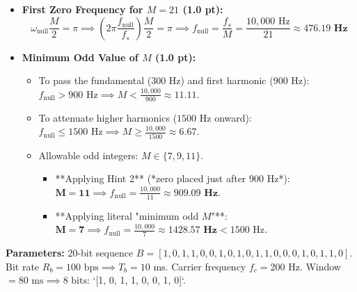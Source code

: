 \documentclass[10pt,a4paper]{article}
\begin{document}
\begin{itemize}[leftmargin=12pt, itemsep=1.5pt]
    \item \textbf{First Zero Frequency for $M = 21$ (1.0 pt):}
    $$\omega_{\text{null}} \frac{M}{2} = \pi \implies \left(2\pi \frac{f_{\text{null}}}{f_s}\right) \frac{M}{2} = \pi \implies f_{\text{null}} = \frac{f_s}{M} = \frac{10,000\text{ Hz}}{21} \approx \mathbf{476.19\text{ Hz}}$$
    \item \textbf{Minimum Odd Value of $M$ (1.0 pt):}
    \begin{itemize}[leftmargin=10pt, itemsep=0.5pt]
        \item To pass the fundamental ($300\text{ Hz}$) and first harmonic ($900\text{ Hz}$): $f_{\text{null}} > 900\text{ Hz} \implies M < \frac{10,000}{900} \approx 11.11$.
        \item To attenuate higher harmonics ($1500\text{ Hz}$ onward): $f_{\text{null}} \le 1500\text{ Hz} \implies M \ge \frac{10,000}{1500} \approx 6.67$.
        \item Allowable odd integers: $M \in \{7, 9, 11\}$.
        \begin{itemize}[leftmargin=8pt, itemsep=0.5pt]
            \item **Applying Hint 2** (*zero placed just after $900\text{ Hz}$*): $\mathbf{M = 11} \implies f_{\text{null}} = \frac{10,000}{11} \approx \mathbf{909.09\text{ Hz}}$.
            \item **Applying literal "minimum odd $M$"**: $\mathbf{M = 7} \implies f_{\text{null}} = \frac{10,000}{7} \approx \mathbf{1428.57\text{ Hz}} < 1500\text{ Hz}$.
        \end{itemize}
    \end{itemize}
\end{itemize}

\vspace{2pt}

\par\vspace{2pt}

\begin{tcolorbox}[
    colframe=themeblue,
    colback=lightbg,
    arc=1.2mm,
    boxrule=0.5pt,
    left=5pt, right=5pt, top=2.5pt, bottom=2.5pt
]
\footnotesize
\textbf{Parameters:} 20-bit sequence $B = [1, 0, 1, 1, 0, 0, 1, 0, 1, 0, 1, 1, 0, 0, 0, 1, 0, 1, 1, 0]$.  
Bit rate $R_b = 100\text{ bps} \implies T_b = 10\text{ ms}$. Carrier frequency $f_c = 200\text{ Hz}$. Window $= 80\text{ ms} \implies 8\text{ bits}$: `[1, 0, 1, 1, 0, 0, 1, 0]`.
\end{tcolorbox}
\end{document}
